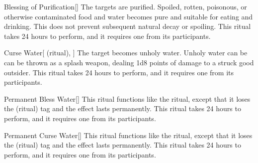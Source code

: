\lowercase{\hypertarget{spell:Blessing of Purification}{}}\label{spell:Blessing of Purification}
\begin{freeability}[Rank 1]{\hypertarget{spell:Blessing of Purification}{Blessing of Purification}}[]
The targets are purified.
Spoiled, rotten, poisonous, or otherwise contaminated food and water becomes pure and suitable for eating and drinking.
This does not prevent subsequent natural decay or spoiling.
This ritual takes 24 hours to perform, and it requires one  from its participants.
\end{freeability}
\vspace{0.25em}



\lowercase{\hypertarget{spell:Curse Water}{}}\label{spell:Curse Water}
\begin{attuneability}[Rank 1]{\hypertarget{spell:Curse Water}{Curse Water}}[ (ritual), ]
The target becomes unholy water.
Unholy water can be can be thrown as a splash weapon, dealing 1d8 points of damage to a struck good outsider.
This ritual takes 24 hours to perform, and it requires one  from its participants.
\end{attuneability}
\vspace{0.25em}



\lowercase{\hypertarget{spell:Permanent Bless Water}{}}\label{spell:Permanent Bless Water}
\begin{freeability}[Rank 3]{\hypertarget{spell:Permanent Bless Water}{Permanent Bless Water}}[]
This ritual functions like the  ritual, except that it loses the  (ritual) tag and the effect lasts permanently.
This ritual takes 24 hours to perform, and it requires one  from its participants.
\end{freeability}
\vspace{0.25em}



\lowercase{\hypertarget{spell:Permanent Curse Water}{}}\label{spell:Permanent Curse Water}
\begin{freeability}[Rank 3]{\hypertarget{spell:Permanent Curse Water}{Permanent Curse Water}}[]
This ritual functions like the  ritual, except that it loses the  (ritual) tag and the effect lasts permanently.
This ritual takes 24 hours to perform, and it requires one  from its participants.
\end{freeability}
\vspace{0.25em}



